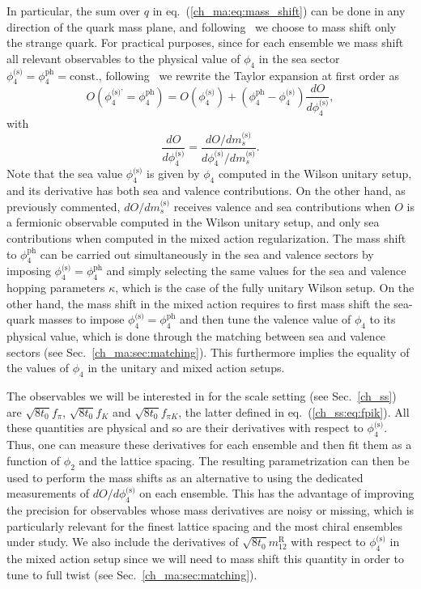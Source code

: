 In particular, the sum over $q$ in eq.~(\ref{ch_ma:eq:mass_shift}) can be done in any direction of the quark mass plane, and following~\citep{Strassberger:2021tsu} we choose to mass shift only the strange quark. For practical purposes, since for each ensemble we mass shift all relevant observables to the physical value of $\phi_4$ in the sea sector $\phi_4^{\textrm{(s)}}=\phi_4^{\textrm{ph}}={\textrm{const.}}$, following~\citep{Strassberger:2023xnj} we rewrite the Taylor expansion at first order as
\begin{equation}
{O}\left(\phi_4^{\textrm{(s)'}}=\phi_4^{\textrm{ph}}\right)={O}\left(\phi_4^{\textrm{(s)}}\right)+\left(\phi_4^{\textrm{ph}}-\phi_4^{\textrm{(s)}}\right)\frac{d{O}}{d\phi_4^{\textrm{(s)}}},
\end{equation}
with
\begin{equation}
\label{ch_ma:eq:dOdphi4}
\frac{d{O}}{d\phi_4^{\textrm{(s)}}}=\frac{d{O}/dm_s^{\textrm{(s)}}}{d\phi_4^{\textrm{(s)}}/dm_s^{\textrm{(s)}}}.
\end{equation}
Note that the sea value $\phi_4^{\textrm{(s)}}$ is given by $\phi_4$ computed in the Wilson unitary setup, and its derivative has both sea and valence contributions. On the other hand, as previously commented, $d{O}/dm_s^{\textrm{(s)}}$ receives valence and sea contributions when ${O}$ is a fermionic observable computed in the Wilson unitary setup, and only sea contributions when computed in the mixed action regularization. The mass shift to $\phi_4^{\textrm{ph}}$ can be carried out simultaneously in the sea and valence sectors by imposing $\phi_4^{\textrm{(s)}}=\phi_4^{\textrm{ph}}$ and simply selecting the same values for the sea and valence hopping parameters $\kappa$, which is the case of the fully unitary Wilson setup. On the other hand, the mass shift in the mixed action requires to first mass shift the sea-quark masses to impose $\phi_4^{\textrm{(s)}}=\phi_4^{\textrm{ph}}$ and then tune the valence value of $\phi_4$ to its physical value, which is done through the matching between sea and valence sectors (see Sec.~\ref{ch_ma:sec:matching}). This furthermore implies the equality of the values of $\phi_4$ in the unitary and mixed action setups.

The observables we will be interested in for the scale setting (see Sec.~\ref{ch_ss}) are $\sqrt{8t_0}f_{\pi}$, $\sqrt{8t_0}f_{K}$ and $\sqrt{8t_0}f_{\pi K}$, the latter defined in eq.~(\ref{ch_ss:eq:fpik}). All these quantities are physical and so are their derivatives with respect to $\phi_4^{\textrm{(s)}}$. Thus, one can measure these derivatives for each ensemble and then fit them as a function of $\phi_2$ and the lattice spacing. The resulting parametrization can then be used to perform the mass shifts as an alternative to using the dedicated measurements of $dO/d\phi_4^{\textrm{(s)}}$ on each ensemble. This has the advantage of improving the precision for observables whose mass derivatives are noisy or missing, which is particularly relevant for the finest lattice spacing and the most chiral ensembles under study.  We also include the derivatives of $\sqrt{8t_0}m_{12}^{\textrm{R}}$ with respect to $\phi_4^{\textrm{(s)}}$ in the mixed action setup since we will need to mass shift this quantity in order to tune to full twist (see Sec.~\ref{ch_ma:sec:matching}).

